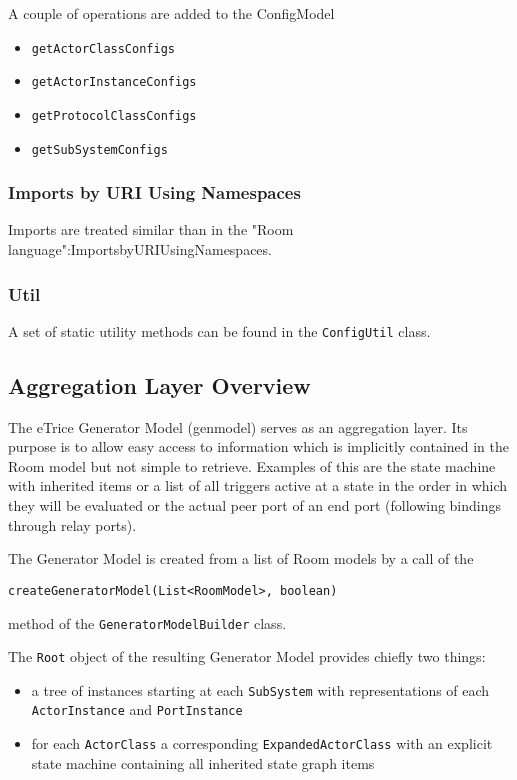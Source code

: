 A couple of operations are added to the ConfigModel
\begin{itemize}
\item \texttt{getActorClassConfigs}
\item \texttt{getActorInstanceConfigs}
\item \texttt{getProtocolClassConfigs}
\item \texttt{getSubSystemConfigs}
\end{itemize}

\subsubsection{Imports by URI Using Namespaces}

Imports are treated similar than in the "Room language":ImportsbyURIUsingNamespaces.

\subsubsection{Util}

A set of static utility methods can be found in the \texttt{ConfigUtil} class.

\subsection{Aggregation Layer Overview}

The eTrice Generator Model (genmodel) serves as an aggregation layer. Its purpose is to allow easy access to information which is implicitly contained in the Room model but not simple to retrieve.
Examples of this are the state machine with inherited items or a list of all triggers active at a state in the order in which they will be evaluated or the actual peer port of an end port (following bindings through relay ports).

The Generator Model is created from a list of Room models by a call of the

\begin{verbatim}createGeneratorModel(List<RoomModel>, boolean)\end{verbatim}

method of the \texttt{GeneratorModelBuilder} class.

The \texttt{Root} object of the resulting Generator Model provides chiefly two things:
\begin{itemize}
\item a tree of instances starting at each \texttt{SubSystem} with representations of each \texttt{ActorInstance} and \texttt{PortInstance}
\item for each \texttt{ActorClass} a corresponding \texttt{ExpandedActorClass} with an explicit state machine containing all inherited state graph items
\end{itemize}


